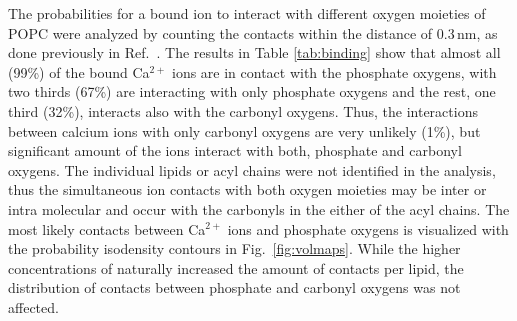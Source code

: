 \documentclass[aip,jcp,twocolumn]{revtex4}
\begin{document}
The probabilities for a bound  ion to interact with
different oxygen moieties of POPC 
were analyzed by counting the contacts within the distance of $0.3 \, \mathrm{nm}$, 
as done previously in Ref.~. 
%
%
%
The results in Table \ref{tab:binding} show that almost all (99\%) of the 
bound Ca$^{2+}$ ions are in contact with the phosphate oxygens,
with two thirds (67\%) are interacting with only phosphate oxygens
and the rest, one third (32\%), interacts also with the carbonyl oxygens. 
Thus, the interactions between
calcium ions with only carbonyl oxygens are very unlikely (1\%), but significant
amount of the ions interact with both, phosphate and carbonyl oxygens.
The individual lipids or acyl chains were not identified in the analysis,
thus the simultaneous ion contacts with both oxygen moieties may be inter or intra molecular
and occur with the carbonyls in the either of the acyl chains.
The most likely contacts between Ca$^{2+}$ ions and phosphate oxygens is visualized with
the probability isodensity contours in Fig.~\ref{fig:volmaps}.
While the higher concentrations of  naturally increased the amount of contacts per lipid,
the distribution of contacts between phosphate and carbonyl oxygens was not affected.
\end{document}
